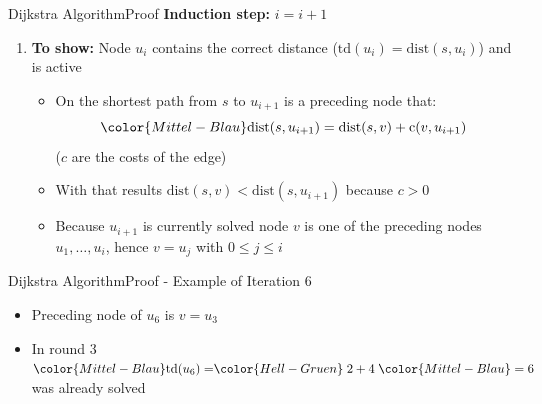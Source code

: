 \begin{frame}{Dijkstra Algorithm}{Proof}
  \textbf{Induction step:} {\color{Mittel-Blau}$i = i+1$}
  \begin{enumerate}
    \item
      \textbf{To show:} Node {\color{Mittel-Blau}$u_i$} contains the correct
      distance ({\color{Mittel-Blau}$\mathrm{td}(u_i) = \mathrm{dist}(s, u_i)$})
      and is active
      \begin{itemize}
        \item
          On the shortest path from {\color{Mittel-Blau}$s$} to
          {\color{Mittel-Blau}$u_{i+1}$} is a preceding node that:
          \begin{displaymath}
            \color{Mittel-Blau}\mathrm{dist}(s, u_{i+1})
            = \mathrm{dist}(s, v) + \mathrm{c}(v, u_{i+1})
          \end{displaymath}
          ({\color{Mittel-Blau}$c$} are the costs of the edge)
          \begin{figure}[!h]
            \begin{adjustbox}{width=0.9\linewidth}
              \def\DijkstraTD{0}%
              
            \end{adjustbox}
          \end{figure}
        \item
          With that results
          {\color{Mittel-Blau}$\mathrm{dist}(s, v) < \mathrm{dist}(s, u_{i+1})$}
          because {\color{Mittel-Blau}$c > 0$}
        \item
          Because {\color{Mittel-Blau}$u_{i+1}$} is currently solved node
          {\color{Mittel-Blau}$v$} is one of the preceding nodes
          {\color{Mittel-Blau}$u_1, \dots, u_i$}, hence
          {\color{Mittel-Blau}$v = u_j$} with
          {\color{Mittel-Blau}$0 \leq j \leq i$}
      \end{itemize}
  \end{enumerate}
\end{frame}


\begin{frame}{Dijkstra Algorithm}{Proof - Example of Iteration 6}
  \begin{figure}[!h]
    \begin{adjustbox}{width=0.9\linewidth}
      
    \end{adjustbox}
  \end{figure}
  \begin{itemize}
    \item
      Preceding node of {\color{Mittel-Blau}$u_6$} is
      {\color{Mittel-Blau}$v = u_3$}
    \item
      In round 3
      \begin{math}
        {\color{Mittel-Blau}\mathrm{td}(u_6) = }
        {\color{Hell-Gruen}\;2 + 4\;}
        {\color{Mittel-Blau} = 6}
      \end{math}
      was already solved
  \end{itemize}
\end{frame}

